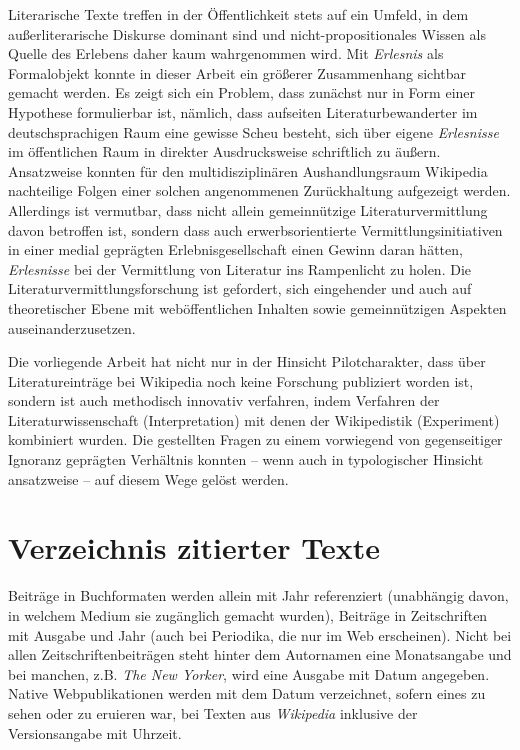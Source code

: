 \documentclass[fontsize=12pt]{scrartcl}
\begin{document}
{{{{Literarische Texte treffen in der \"Of\-fent\-lichkeit stets auf ein Umfeld, in dem au{\ss}erli\-te\-ra\-rische Diskurse dominant sind und nicht-pro\-po\-si\-ti\-o\-na\-les Wissen als Quelle des Erlebens daher kaum wahrgenommen wird. Mit \textit{Erlesnis} als Formalobjekt konnte in dieser Arbeit ein gr\"o{\ss}erer Zusammenhang sichtbar gemacht werden. Es zeigt sich ein Pro\-blem, dass zun\"achst nur in Form einer Hypothese formulierbar ist, n\"amlich, dass aufsei\-ten Li\-te\-ra\-tur\-be\-wan\-der\-ter im deutschspra\-chi\-gen Raum eine gewisse Scheu be\-steht, sich \"uber eigene \textit{Erlesnisse} im \"of\-fent\-lichen Raum in direkter Ausdrucksweise schriftlich zu \"au{\ss}ern. Ansatzweise konnten f\"ur den multidisziplin\"aren Aus\-hand\-lungs\-raum Wi\-ki\-pe\-dia nachteilige Folgen einer solchen angenommenen Zur\"uckhaltung auf\-ge\-zeigt werden. Al\-ler\-dings ist vermutbar, dass nicht allein gemeinn\"utzige Li\-te\-ra\-tur\-ver\-mitt\-lung davon betroffen ist, sondern dass auch erwerbsorientierte Ver\-mitt\-lungsinitiativen in einer medial gepr\"agten Erlebnisge\-sell\-schaft einen Gewinn daran h\"atten, \textit{Erlesnisse} bei der Ver\-mitt\-lung von Li\-te\-ra\-tur ins Rampenlicht zu holen. Die Li\-te\-ra\-tur\-ver\-mitt\-lungsfor\-schung ist gefordert, sich eingehender und auch auf theo\-retischer Ebene mit web\"of\-fent\-lichen Inhalten sowie gemeinn\"utzigen Aspekten aus\-ein\-an\-der\-zu\-set\-zen.

Die vorliegende Arbeit hat nicht nur in der Hinsicht Pilot\textsuperscript{\tiny *}charakter, dass \"uber Li\-te\-ra\-tur\-eintr\"age bei Wi\-ki\-pe\-dia noch keine For\-schung pu\-bli\-ziert worden ist, sondern ist auch methodisch innovativ verfahren, indem Verfahren der Li\-te\-ra\-tur\-wissenschaft (Interpretation) mit denen der Wikipedistik (Experiment) kombiniert wurden. Die gestellten Fragen zu einem vorwiegend von gegenseitiger Ignoranz gepr\"agten Ver\-h\"alt\-nis konnten -- wenn auch in typologischer Hinsicht ansatzweise -- auf diesem Wege gel\"ost werden.

\newpage
\section{Verzeichnis zitierter Texte}
\label{sec:9}

\singlespacing

Beitr\"age in Buchformaten werden allein mit Jahr referenziert (unabh\"angig davon, in wel\-chem Medium sie zug\"ang\-lich gemacht wurden), Beitr\"age in Zeitschriften mit Ausgabe und Jahr (auch bei Periodika, die nur im Web erscheinen). Nicht bei allen Zeitschriftenbeitr\"agen steht hinter dem Autor\textsuperscript{\tiny *}namen eine Monatsangabe und bei manchen, z.B. \textit{The New Yorker}, wird eine Ausgabe mit Datum angegeben. Native Webpublikationen werden mit dem Datum verzeichnet, sofern eines zu sehen oder zu eruieren war, bei Texten aus \textit{Wi\-ki\-pe\-dia} inklusive der Versionsangabe mit Uhrzeit.

}}}}
\end{document}
